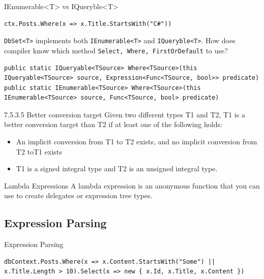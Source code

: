 \documentclass{bredelebeamer}
\begin{document}
\begin{frame}[fragile]{IEnumerable<T> vs IQueryble<T>}
    \begin{lstlisting}
ctx.Posts.Where(x => x.Title.StartsWith("C#"))
    \end{lstlisting}
    \lstinline{DbSet<T>} implements both \lstinline{IEnumerable<T>} and \lstinline{IQueryble<T>}.
    How does compiler know which method \lstinline{Select, Where, FirstOrDefault} to use?
    \begin{lstlisting}
public static IQueryable<TSource> Where<TSource>(this IQueryable<TSource> source, Expression<Func<TSource, bool>> predicate)
public static IEnumerable<TSource> Where<TSource>(this IEnumerable<TSource> source, Func<TSource, bool> predicate)
    \end{lstlisting}
    \pause
    \begin{block}{7.5.3.5 Better conversion target}
        Given two different types T1 and T2, T1 is a better conversion target than T2 if at least one of the following holds:
        \begin{itemize}
            \item An implicit conversion from T1 to T2 exists, and no implicit conversion from T2 toT1 exists
            \item T1 is a signed integral type and T2 is an unsigned integral type.
        \end{itemize}
    \end{block}
    \begin{exampleblock}{Lambda Expressions}
        A lambda expression is an anonymous function that you can use to create delegates or expression tree types.
    \end{exampleblock}
\end{frame}
\subsection{Expression Parsing}
\begin{frame}[fragile]{Expression Parsing}
    \begin{lstlisting}
dbContext.Posts.Where(x => x.Content.StartsWith("Some") || x.Title.Length > 10).Select(x => new { x.Id, x.Title, x.Content })
    \end{lstlisting}
    \pause
    
\end{frame}
\end{document}

